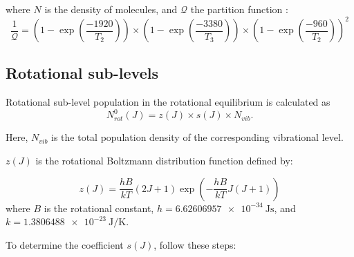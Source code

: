 where $N$ is the density of  molecules, and $\mathcal{Q}$ the partition function \cite{Witteman-1987}:
\begin{equation}
\frac{1}{\mathcal{Q}} = \left(1-\exp\left(\frac{-1920}{T_2}\right)\right) \times \left(1-\exp\left(\frac{-3380}{T_3}\right)\right) \times \left(1-\exp\left(\frac{-960}{T_2}\right)\right)^2
\end{equation}




\subsection{Rotational sub-levels}

Rotational sub-level population in the rotational equilibrium is calculated as
\begin{equation}
N_{rot}^0(J) = z(J) \times s(J) \times N_{vib}.
\end{equation}

Here, \( N_{vib} \) is the total population density of the corresponding vibrational level.

$z(J)$ is the rotational Boltzmann distribution function defined by:

\begin{equation}\label{eq:z}
z(J) = \frac{hB}{kT}(2J+1)\exp \left(-\frac{hB}{kT}J(J+1)\right)
\end{equation}
where $B$ is the rotational constant, $h = \SI{6.62606957e-34}{\joule\second}$, and $k = \SI{1.3806488e-23}{\joule\per\kelvin}$.

To determine the coefficient \( s(J) \), follow these steps:

